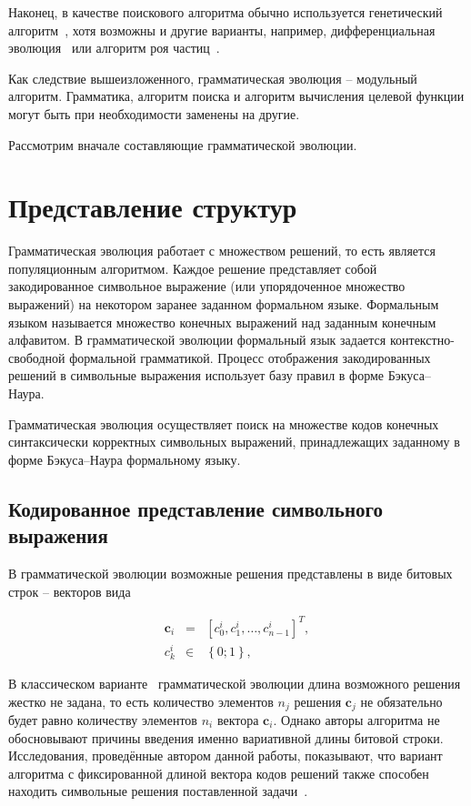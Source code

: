 Наконец, в качестве поискового алгоритма обычно используется генетический алгоритм~\cite{Ryan1998}, хотя возможны и другие варианты, например, дифференциальная эволюция~\cite{ONeill2006} или алгоритм роя частиц~\cite{ONeill2006a}.

Как следствие вышеизложенного, грамматическая эволюция -- модульный алгоритм.
Грамматика, алгоритм поиска и алгоритм вычисления целевой функции могут быть при необходимости заменены на другие.

Рассмотрим вначале составляющие грамматической эволюции.

\section{Представление структур} \label{sect:representation}

Грамматическая эволюция работает с множеством решений, то есть является популяционным алгоритмом.
Каждое решение представляет собой закодированное символьное выражение (или упорядоченное множество выражений) на некотором заранее заданном формальном языке.
Формальным языком называется множество конечных выражений над заданным конечным алфавитом.
В грамматической эволюции формальный язык задается контекстно-свободной формальной грамматикой.
Процесс отображения закодированных решений в символьные выражения использует базу правил в форме Бэкуса--Наура.

Грамматическая эволюция осуществляет поиск на множестве кодов конечных синтаксически корректных символьных выражений, принадлежащих заданному в форме Бэкуса--Наура формальному языку.

\subsection{Кодированное представление символьного выражения} \label{subsect:code}

В грамматической эволюции возможные решения представлены в виде битовых строк -- векторов вида

\begin{equation}
    \begin{array}{lcl}
        \mathbf{c}_i & = & \left[c^i_0, c^i_1, \dots, c^i_{n-1}\right]^T, \\
        c^i_k & \in & \left\{0; 1 \right\},
    \end{array}
    \label{ge:eq:chrom}
\end{equation}

В классическом варианте~\cite{ONeill2003} грамматической эволюции длина возможного решения жестко не задана, то есть количество элементов $n_j$ решения $\mathbf{c}_j$ не обязательно будет равно количеству элементов $n_i$ вектора $\mathbf{c}_i$.
Однако авторы алгоритма не обосновывают причины введения именно вариативной длины битовой строки.
Исследования, проведённые автором данной работы, показывают, что вариант алгоритма с фиксированной длиной вектора кодов решений также способен находить символьные решения поставленной задачи~\cite{DivKazSof2013}.

